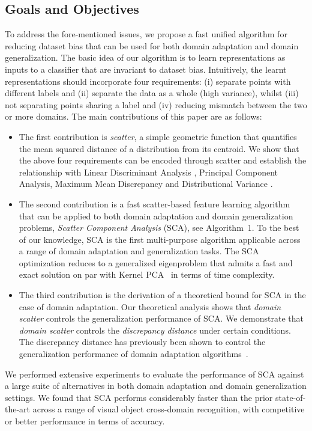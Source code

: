 \documentclass[10pt,journal,compsoc]{IEEEtran}
\begin{document}
\subsection{Goals and Objectives}
To address the fore-mentioned issues, we propose a fast unified algorithm for reducing dataset bias that can be used for both domain adaptation and domain generalization. 
The basic idea of our algorithm is to learn representations as inputs to a classifier that are invariant to dataset bias.
Intuitively, the learnt representations should incorporate four requirements: 
(i) separate points with different labels and 
(ii) separate the data as a whole (high variance), whilst 
(iii) not separating points sharing a label and 
(iv) reducing mismatch between the two or more domains.
The main contributions of this paper are as follows:
\begin{itemize}[leftmargin=*]
 \item The first contribution is \emph{scatter}, a simple geometric function that quantifies the mean squared distance of a distribution from its centroid. 
 We show that the above four requirements can be encoded through scatter and establish the relationship with Linear Discriminant Analysis \cite{Fisher1936}, Principal Component Analysis, Maximum Mean Discrepancy \cite{Borgwardt:2006aa} and Distributional Variance \cite{Muandet2013}.
 \item The second contribution is a fast scatter-based feature learning algorithm that can be applied to both domain adaptation and domain generalization problems, \emph{Scatter Component Analysis} (SCA), see Algorithm~1. To the best of our knowledge, SCA is the first multi-purpose algorithm applicable across a range of domain adaptation and generalization tasks. 
 The SCA optimization reduces to a generalized eigenproblem that admits a fast and exact solution on par with Kernel PCA~\cite{Scholkopf1998} in terms of time complexity.
 \item The third contribution is the derivation of a theoretical bound for SCA in the case of domain adaptation.
 Our theoretical analysis shows that \emph{domain scatter} controls the generalization performance of SCA.
 We demonstrate that \emph{domain scatter} controls the \emph{discrepancy distance} under certain conditions. The discrepancy distance has previously been shown to control the generalization performance of domain adaptation algorithms~\cite{Mansour2009}. 
\end{itemize}

We performed extensive experiments to evaluate the performance of SCA against a large suite of alternatives in both domain adaptation and domain generalization settings.
We found that SCA performs considerably faster than the prior state-of-the-art across a range of visual object cross-domain recognition, with competitive or better performance in terms of accuracy.
\end{document}
